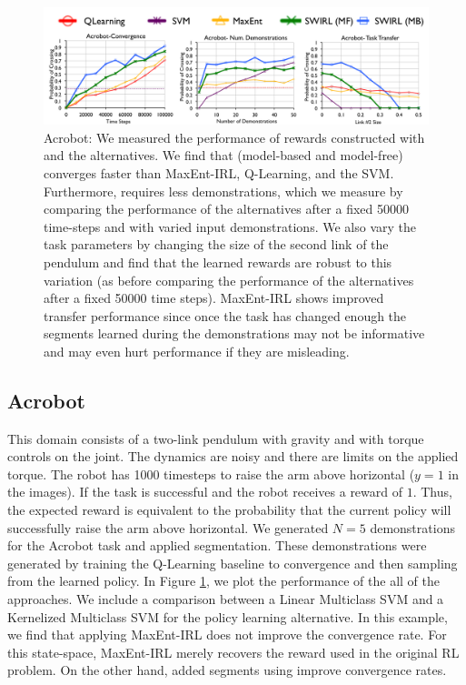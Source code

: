 \begin{figure}[t]
\centering
 \includegraphics[width=\columnwidth]{exp/acr-convergence-1.png}
 \caption{Acrobot: We measured the performance of rewards constructed with \hirl and the alternatives. We find that \hirl (model-based and model-free) converges faster than MaxEnt-IRL, Q-Learning, and the SVM.
 Furthermore, \hirl requires less demonstrations, which we measure by comparing the performance of the alternatives after a fixed 50000 time-steps and with varied input demonstrations. 
 We also vary the task parameters by changing the size of the second link of the pendulum and find that the learned rewards are robust to this variation (as before comparing the performance of the alternatives after a fixed 50000 time steps). MaxEnt-IRL shows improved transfer performance since once the task has changed enough the segments learned during the demonstrations may not be informative and may even hurt performance if they are misleading. 
 \label{exp:acsegmentation-res2}}
\end{figure}

\subsection{Acrobot}\label{exp:acrobot}
This domain consists of a two-link pendulum with gravity and with torque controls on the joint. The dynamics are noisy and there are limits on the applied torque. The robot has 1000 timesteps to raise the arm above horizontal ($y=1$ in the images). If the task is successful and the robot receives a reward of $1$. 
Thus, the expected reward is equivalent to the probability that the current policy will successfully raise the arm above horizontal.
We generated $N=5$ demonstrations for the Acrobot task and applied segmentation. 
These demonstrations were generated by training the Q-Learning baseline to convergence and then sampling from the learned policy.
In Figure \ref{exp:acsegmentation-res2}, we plot the performance of the all of the approaches.
We include a comparison between a Linear Multiclass SVM and a Kernelized Multiclass SVM for the policy learning alternative.
In this example, we find that applying MaxEnt-IRL does not improve the convergence rate.
For this state-space, MaxEnt-IRL merely recovers the reward used in the original RL problem.
On the other hand, added segments using \hirl improve convergence rates.

